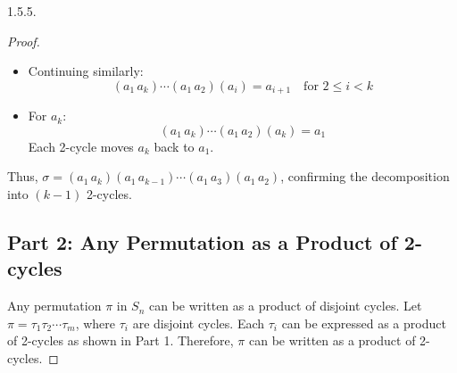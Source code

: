 \documentclass[12pt]{amsart}
\theoremstyle{definition}
\numberwithin{equation}{section}
\begin{document}
\begin{exercise}{1.5.5.}
\begin{proof}
\begin{itemize}[label=--]
    \item Continuing similarly:
    \[
    (a_1 \, a_k) \cdots (a_1 \, a_2)(a_i) = a_{i+1} \quad \text{for } 2 \leq i < k
    \]

    \item For \( a_k \):
    \[
    (a_1 \, a_k) \cdots (a_1 \, a_2)(a_k) = a_1
    \]
    Each 2-cycle moves \( a_k \) back to \( a_1 \).
\end{itemize}

\noindent Thus, \( \sigma = (a_1 \, a_k)(a_1 \, a_{k-1}) \cdots (a_1 \, a_3)(a_1 \, a_2) \), confirming the decomposition into \( (k-1) \) 2-cycles.

\subsection*{Part 2: Any Permutation as a Product of 2-cycles}

Any permutation \( \pi \) in \( S_n \) can be written as a product of disjoint cycles. Let \( \pi = \tau_1 \tau_2 \cdots \tau_m \), where \( \tau_i \) are disjoint cycles. Each \( \tau_i \) can be expressed as a product of 2-cycles as shown in Part 1. Therefore, \( \pi \) can be written as a product of 2-cycles.
        \end{proof}
    \end{exercise}
    \newpage
\end{document}
